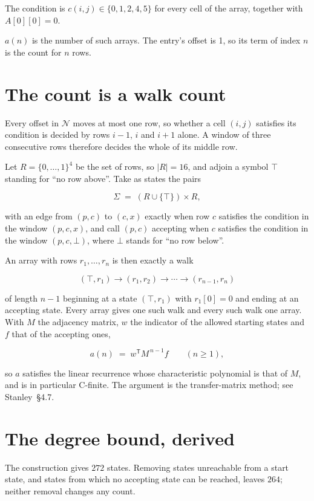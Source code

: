 \documentclass[11pt]{article}
\theoremstyle{definition}
\begin{document}
The condition is $c(i,j) \in \{0, 1, 2, 4, 5\}$ for every cell of the array, together with $A[0][0]=0$.

$a(n)$ is the number of such arrays. The entry's offset is 1, so its term of index $n$ is the count for $n$ rows.

\section{The count is a walk count}

Every offset in $\mathcal{N}$ moves at most one row, so whether a cell $(i,j)$ satisfies its condition is decided by rows $i-1$, $i$ and $i+1$ alone. A window of three consecutive rows therefore decides the whole of its middle row.

Let $R = \{0,\dots,1\}^{4}$ be the set of rows, so $|R| = 16$, and adjoin a symbol $\top$ standing for ``no row above''. Take as states the pairs

\[\Sigma \;=\; (R \cup \{\top\}) \times R,\]

with an edge from $(p,c)$ to $(c,x)$ exactly when row $c$ satisfies the condition in the window $(p,c,x)$, and call $(p,c)$ accepting when $c$ satisfies the condition in the window $(p,c,\bot)$, where $\bot$ stands for ``no row below''.

An array with rows $r_1,\dots,r_n$ is then exactly a walk

\[(\top,r_1) \to (r_1,r_2) \to \cdots \to (r_{n-1},r_n)\]

of length $n-1$ beginning at a state $(\top,r_1)$ with $r_1[0]=0$ and ending at an accepting state. Every array gives one such walk and every such walk one array. With $M$ the adjacency matrix, $w$ the indicator of the allowed starting states and $f$ that of the accepting ones,

\[a(n) \;=\; w^{\mathsf T} M^{\,n-1} f \qquad (n \ge 1),\]

so $a$ satisfies the linear recurrence whose characteristic polynomial is that of $M$, and is in particular C-finite. The argument is the transfer-matrix method; see Stanley~\S4.7.

\section{The degree bound, derived}

The construction gives $272$ states. Removing states unreachable from a start state, and states from which no accepting state can be reached, leaves $264$; neither removal changes any count.
\end{document}
